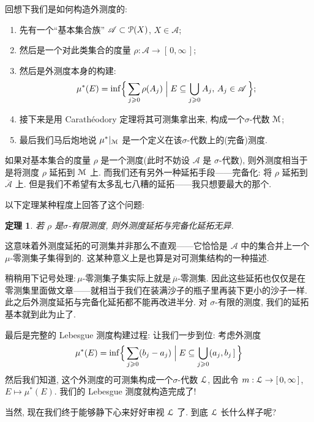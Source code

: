 \documentclass[twoside, fontset=fandol]{ctexart}
\let \mathcal \EuScript
\theoremstyle{innocent}
\newtheorem*{theorem}{定理}
\begin{document}
回想下我们是如何构造外测度的:
\begin{enumerate}
    \item 先有一个``基本集合族'' $\mathscr A\subset\mathcal P(X)$, $X\in\mathscr A$;
    \item 然后是一个对此类集合的度量 $\rho :\mathscr A\to [\,0,\infty\,]$;
    \item 然后是外测度本身的构建: \[\mu^*(E) = \inf\Bigl\{ \,\sum_{j\geqslant 0}\rho (A_j)\Bigm| E\subseteq\bigcup_{j\geqslant 0}A_j,\,A_j\in\mathscr A\, \Bigr\};\]
    \item 接下来是用 Carathéodory 定理将其可测集拿出来, 构成一个\;$\sigma $-代数 $\mathcal M$;
    \item 最后我们马后炮地说 $\mu^*|_{\mathcal M}$ 是一个定义在该\;$\sigma $-代数上的(完备)测度.
\end{enumerate}
如果对基本集合的度量 $\rho $ 是一个测度(此时不妨设 $\mathscr A$ 是 $\sigma$-代数), 则外测度相当于是将测度 $\rho$ 延拓到 $\mathcal M$ 上. 而我们还有另外一种延拓手段------完备化: 将 $\rho $ 延拓到 $\overline{\mathscr A}$ 上. 但是我们不希望有太多乱七八糟的延拓------我只想要最大的那个.

以下定理某种程度上回答了这个问题:
\begin{theorem}
    若 $\rho $ 是\;$\sigma $-有限测度, 则外测度延拓与完备化延拓无异.
\end{theorem}
这意味着外测度延拓的可测集并非那么不直观------它恰恰是 $\mathscr A$ 中的集合并上一个\;$\mu $-零测集子集得到的. 这某种意义上是也算是对可测集结构的一种描述.

稍稍用下记号处理:\,\;$\mu $-零测集子集实际上就是\,$\overline{\mu }$-零测集. 因此这些延拓也仅仅是在零测集里面做文章------就相当于我们在装满沙子的瓶子里再装下更小的沙子一样. 此之后外测度延拓与完备化延拓都不能再改进半分. 对 $\sigma$-有限的测度, 我们的延拓基本就到此为止了.

最后是完整的 Lebesgue 测度构建过程: 让我们一步到位: 考虑外测度
\[
    \mu ^*(E) = \inf\Bigl\{ \,\sum_{j\geqslant 0}(b_j-a_j)\Bigm| E\subseteq\bigcup_{j\geqslant 0}(a_j,b_j\,]\, \Bigr\}
\]
然后我们知道, 这个外测度的可测集构成一个\;$\sigma $-代数 $\mathcal L$, 因此令 $m:\mathcal L\to [\,0,\infty\,]$, $E\mapsto \mu ^*(E)$. 我们的 Lebesgue 测度就构造完成了!

当然, 现在我们终于能够静下心来好好审视 $\mathcal L$ 了. 到底 $\mathcal L$ 长什么样子呢?
\end{document}

